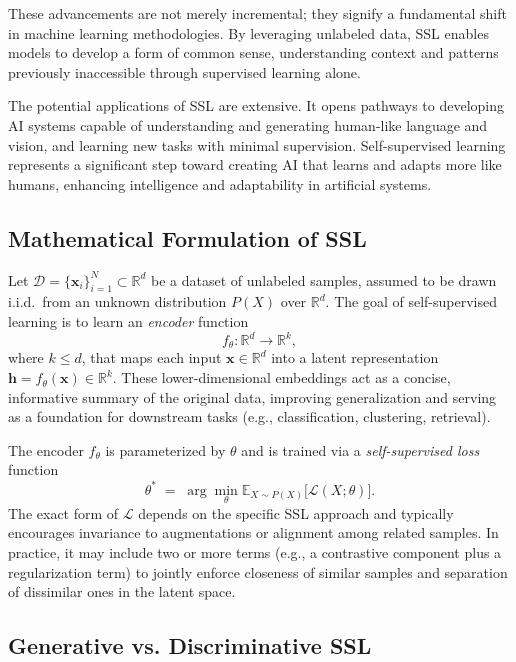 These advancements are not merely incremental; they signify a fundamental shift in machine learning methodologies. By leveraging unlabeled data, SSL enables models to develop a form of common sense, understanding context and patterns previously inaccessible through supervised learning alone.

The potential applications of SSL are extensive. It opens pathways to developing AI systems capable of understanding and generating human-like language and vision, and learning new tasks with minimal supervision. Self-supervised learning represents a significant step toward creating AI that learns and adapts more like humans, enhancing intelligence and adaptability in artificial systems.


\subsection{Mathematical Formulation of SSL}

Let \(\mathcal{D} = \{\mathbf{x}_i\}_{i=1}^N \subset \mathbb{R}^d\) be a dataset of unlabeled samples, assumed to be drawn i.i.d.\ from an unknown distribution \(P(X)\) over \(\mathbb{R}^d\). The goal of self-supervised learning is to learn an \emph{encoder} function
\[
f_{\theta} : \mathbb{R}^d \to \mathbb{R}^k,
\]
where \(k \le d\), that maps each input \(\mathbf{x} \in \mathbb{R}^d\) into a latent representation \(\mathbf{h} = f_{\theta}(\mathbf{x}) \in \mathbb{R}^k\). These lower-dimensional embeddings act as a concise, informative summary of the original data, improving generalization and serving as a foundation for downstream tasks (e.g., classification, clustering, retrieval).

The encoder \(f_{\theta}\) is parameterized by \(\theta\) and is trained via a \emph{self-supervised loss} function
\[
\theta^* \;=\; \arg\min_{\theta} \mathbb{E}_{X \sim P(X)}\!\bigl[\mathcal{L}(X; \theta)\bigr].
\]
The exact form of \(\mathcal{L}\) depends on the specific SSL approach and typically encourages invariance to augmentations or alignment among related samples. In practice, it may include two or more terms (e.g., a contrastive component plus a regularization term) to jointly enforce closeness of similar samples and separation of dissimilar ones in the latent space.

\subsection{Generative vs. Discriminative SSL}


